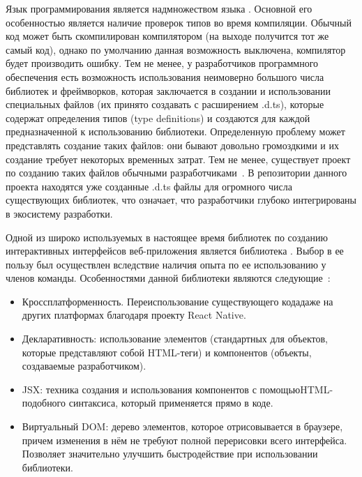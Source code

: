 Язык программирования \typescript является надмножеством языка \js. Основной его особенностью является наличие проверок типов во время компиляции. Обычный \js код может быть скомпилирован \typescript компилятором (на выходе получится тот же самый код), однако по умолчанию данная возможность выключена, компилятор будет производить ошибку. Тем не менее, у разработчиков программного обеспечения есть возможность использования неимоверно большого числа \js библиотек и фреймворков, которая заключается в создании и использовании специальных файлов (их принято создавать с расширением .d.ts), которые содержат определения типов (type definitions) и создаются для каждой предназначенной к использованию библиотеки. Определенную проблему может представлять создание таких файлов: они бывают довольно громоздкими и их создание требует некоторых временных затрат. Тем не менее, существует проект по созданию таких файлов обычными разработчиками~\cite{githubDefinitelytyped}. В репозитории данного проекта находятся уже созданные .d.ts файлы для огромного числа существующих библиотек, что означает, что \typescript разработчики глубоко интегрированы в экосистему \js разработки.

Одной из широко используемых в настоящее время библиотек по созданию интерактивных интерфейсов веб-приложения является библиотека \react. Выбор в ее пользу был осуществлен вследствие наличия опыта по ее использованию у членов команды. Особенностями данной библиотеки являются следующие~\cite{habr_react_introduction}:

\begin{itemize}
	\item Кроссплатформенность. Переиспользование существующего кода даже на других платформах благодаря проекту React Native.
	\item Декларативность: использование элементов (стандартных для \react \linebreak объектов, которые представляют собой HTML-теги) и компонентов (объекты, создаваемые разработчиком).
	\item JSX: техника создания и использования компонентов с помощью\linebreak HTML-подобного синтаксиса, который применяется прямо в \js коде.
	\item Виртуальный DOM: дерево \react элементов, которое отрисовывается в браузере, причем изменения в нём не требуют полной перерисовки всего интерфейса. Позволяет значительно улучшить быстродействие при использовании библиотеки.
\end{itemize}

